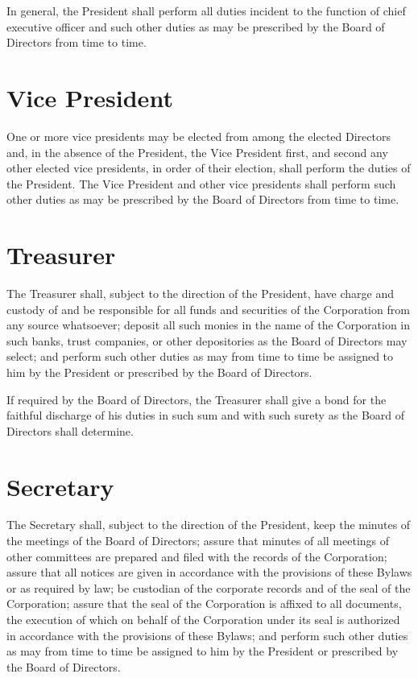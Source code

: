 \documentclass[12pt]{report}
\begin{document}
In general, the President shall perform all duties incident to the function of chief executive officer and such other duties as may be prescribed by the Board of Directors from time to time.

\section{Vice President}

One or more vice presidents may be elected from among the elected Directors and, in the absence of the President, the Vice President first, and second any other elected vice presidents, in order of their election, shall perform the duties of the President. The Vice President and other vice presidents shall perform such other duties as may be prescribed by the Board of Directors from time to time.

\section{Treasurer}

The Treasurer shall, subject to the direction of the President, have charge and custody of and be responsible for all funds and securities of the Corporation from any source whatsoever; deposit all such monies in the name of the Corporation in such banks, trust companies, or other depositories as the Board of Directors may select; and perform such other duties as may from time to time be assigned to him by the President or prescribed by the Board of Directors.

If required by the Board of Directors, the Treasurer shall give a bond for the faithful discharge of his duties in such sum and with such surety as the Board of Directors shall determine.

\section{Secretary}

The Secretary shall, subject to the direction of the President, keep the minutes of the meetings of the Board of Directors; assure that minutes of all meetings of other committees are prepared and filed with the records of the Corporation; assure that all notices are given in accordance with the provisions of these Bylaws or as required by law; be custodian of the corporate records and of the seal of the Corporation; assure that the seal of the Corporation is affixed to all documents, the execution of which on behalf of the Corporation under its seal is authorized in accordance with the provisions of these Bylaws; and perform such other duties as may from time to time be assigned to him by the President or prescribed by the Board of Directors.
\end{document}

